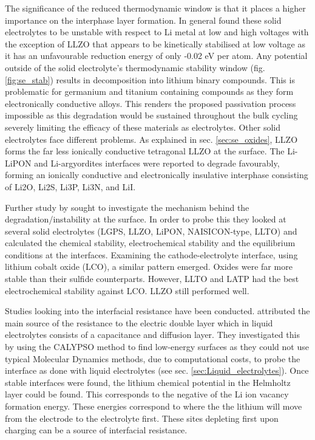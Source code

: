 \documentclass[../main.tex]{subfiles}
\begin{document}
The significance of the reduced thermodynamic window is that it places a higher importance on the interphase layer formation. In general \citeauthor{Zhu2015} found these solid electrolytes to be unstable with respect to Li metal at low and high voltages with the exception of LLZO that appears to be kinetically stabilised at low voltage as it has an unfavourable reduction energy of only -0.02 eV per atom. Any potential outside of the solid electrolyte's thermodynamic stability window (fig. \ref{fig:se_stab}) results in decomposition into lithium binary compounds. This is problematic for germanium and titanium containing compounds as they form electronically conductive alloys.\cite{Zhu2015} This renders the proposed passivation process impossible\cite{Mo2012, Zhu2015} as this degradation would be sustained throughout the bulk cycling severely limiting the efficacy of these materials as electrolytes. Other solid electrolytes face different problems. As explained in sec. \ref{sec:se_oxides}, LLZO forms the far less ionically conductive tetragonal LLZO at the surface. The Li-LiPON and Li-argyordites interfaces were reported to degrade favourably, forming an ionically conductive and electronically insulative interphase consisting of Li2O, Li2S, Li3P, Li3N, and LiI.\cite{Zhu2015} 

Further study by \citeauthor{Zhu2016} sought to investigate the mechanism behind the degradation/instability at the surface.\cite{Zhu2016} In order to probe this they looked at several solid electrolytes (LGPS, LLZO, LiPON, NAISICON-type, LLTO) and calculated the chemical stability, electrochemical stability and the equilibrium conditions at the interfaces. Examining the cathode-electrolyte interface, using lithium cobalt oxide (LCO), a similar pattern emerged. Oxides were far more stable than their sulfide counterparts. However, LLTO and LATP had the best electrochemical stability against LCO. LLZO still performed well. 

Studies looking into the interfacial resistance have been conducted. \citeauthor{Tateyama2019} attributed the main source of the resistance to the electric double layer which in liquid electrolytes consists of a capacitance and diffusion layer.\cite{Tateyama2019} They investigated this by using the CALYPSO method to find low-energy surfaces\cite{Gao2019} as they could not use typical Molecular Dynamics methods, due to computational costs, to probe the interface as done with liquid electrolytes (see sec. \ref{sec:Liquid_electrolytes}). Once stable interfaces were found, the lithium chemical potential in the Helmholtz layer could be found. This corresponds to the negative of the Li ion vacancy formation energy. These energies correspond to where the the lithium will move from the electrode to the electrolyte first. These sites depleting first upon charging can be a source of interfacial resistance. 
\end{document}
